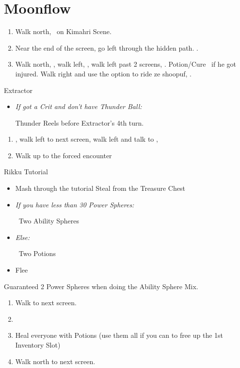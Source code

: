 \chapter{Moonflow}

\begin{enumerate}
	\item Walk north, \sd\ on Kimahri Scene.
	\item Near the end of the screen, go left through the hidden path. .
	\item Walk north, \sd, walk left, \sd, walk left past 2 screens, \sd.  Potion/Cure \tidus\ if he got injured. Walk right and use the  option to ride ze shoopuf, \sd.
\end{enumerate}
\bothvfill\winvfill\lossvfill
\begin{battle}[4000]{Extractor}
	\begin{itemize}
		\tidusf Haste self, then \wakka
		\wakkaf Attack
		\tidusf \textit{If Lightning Steel:}
		\begin{itemize}
			\item Cheer x1
		\end{itemize}
		\textit{Else:}
		\begin{itemize}
			\item Cheer x4
		\end{itemize}
		\tidusf Attack
		\item \textit{If got a Crit and don't have Thunder Ball:}
		\begin{itemize}
			\wakkaf \od Thunder Reels before Extractor's 4th turn.
		\end{itemize}
	\end{itemize}
\end{battle}
\begin{enumerate}[resume]
	\item \sd, walk left to next screen, walk left and talk to \rikku, \sd
	\item Walk up to the forced encounter
\end{enumerate}
\begin{battle}{Rikku Tutorial}
	\begin{itemize}
		\item Mash through the tutorial
		\rikkuf Steal from the Treasure Chest
		\item \textit{If you have less than 30 Power Spheres:}
		      \begin{itemize}
			      \rikkuf \od\ Two Ability Spheres
		      \end{itemize}
		\item \textit{Else:}
		      \begin{itemize}
			      \rikkuf \od\ Two Potions
		      \end{itemize}
		\item Flee
	\end{itemize}
Guaranteed 2 Power Spheres when doing the Ability Sphere Mix.
\end{battle}
\begin{enumerate}[resume]
	\item Walk to next screen.
	\item \formation{\tidus}{\wakka}{\auron}
	\item Heal everyone with Potions (use them all if you can to free up the 1st Inventory Slot)
	\item Walk north to next screen.
\end{enumerate}